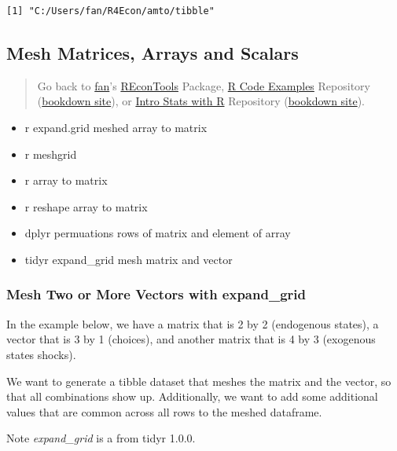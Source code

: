 \documentclass[
]{book}
\providecommand{\tightlist}{%
  \setlength{\itemsep}{0pt}\setlength{\parskip}{0pt}}
\begin{document}
\begin{verbatim}
[1] "C:/Users/fan/R4Econ/amto/tibble"
\end{verbatim}

\hypertarget{mesh-matrices-arrays-and-scalars}{%
\subsection{Mesh Matrices, Arrays and Scalars}\label{mesh-matrices-arrays-and-scalars}}

\begin{quote}
Go back to \href{http://fanwangecon.github.io/}{fan}'s \href{https://fanwangecon.github.io/REconTools/}{REconTools} Package, \href{https://fanwangecon.github.io/R4Econ/}{R Code Examples} Repository (\href{https://fanwangecon.github.io/R4Econ/bookdown}{bookdown site}), or \href{https://fanwangecon.github.io/Stat4Econ/}{Intro Stats with R} Repository (\href{https://fanwangecon.github.io/Stat4Econ/bookdown}{bookdown site}).
\end{quote}

\begin{itemize}
\tightlist
\item
  r expand.grid meshed array to matrix
\item
  r meshgrid
\item
  r array to matrix
\item
  r reshape array to matrix
\item
  dplyr permuations rows of matrix and element of array
\item
  tidyr expand\_grid mesh matrix and vector
\end{itemize}

\hypertarget{mesh-two-or-more-vectors-with-expand_grid}{%
\subsubsection{Mesh Two or More Vectors with expand\_grid}\label{mesh-two-or-more-vectors-with-expand_grid}}

In the example below, we have a matrix that is 2 by 2 (endogenous states), a vector that is 3 by 1 (choices), and another matrix that is 4 by 3 (exogenous states shocks).

We want to generate a tibble dataset that meshes the matrix and the vector, so that all combinations show up. Additionally, we want to add some additional values that are common across all rows to the meshed dataframe.

Note \emph{expand\_grid} is a from tidyr 1.0.0.
\end{document}

